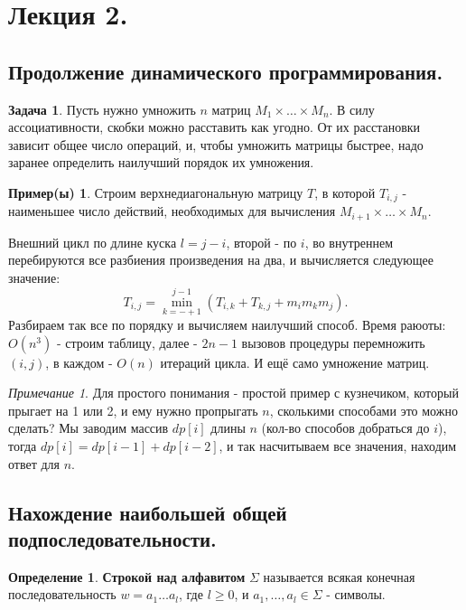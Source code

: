 \documentclass[a4paper]{article}
\theoremstyle{indented}
\theoremstyle{definition}
\newtheorem{defn}{Определение}
\newtheorem{exl}{Пример(ы)}
\newtheorem{prob}{Задача}
\theoremstyle{remark}
\newtheorem{remark}{Примечание}
\begin{document}
\section{Лекция 2.}

\subsection{Продолжение динамического программирования.}

\begin{prob}
    Пусть нужно умножить $n$ матриц $M_1 \times \ldots \times M_n$. В силу ассоциативности, скобки можно расставить как угодно. От их расстановки зависит общее число операций, и, чтобы умножить матрицы быстрее, надо заранее определить наилучший порядок их умножения.
\end{prob}

\begin{exl}
    Строим верхнедиагональную матрицу $T$, в которой $T_{i, j}$ - наименьшее число действий, необходимых для вычисления $M_{i+1} \times \ldots \times M_n$. \ 

    Внешний цикл по длине куска $l=j-i$, второй - по $i$, во внутреннем перебируются все разбиения произведения на два, и вычисляется следующее значение:
    \[
        T_{i, j}=\min_{k=-+1}^{j-1}(T_{i, k}+T_{k, j}+m_im_km_j). 
    \]
    Разбираем так все по порядку и вычисляем наилучший способ. Время раюоты: $O(n^3)$ - строим таблицу, далее - $2n-1$ вызовов процедуры перемножить $(i, j)$, в каждом - $O(n)$ итераций цикла. И ещё само умножение матриц.
\end{exl}

\begin{remark}
    Для простого понимания - простой пример с кузнечиком, который прыгает на 1 или 2, и ему нужно пропрыгать $n$, сколькими способами это можно сделать? Мы заводим массив $dp[i]$ длины $n$ (кол-во способов добраться до $i$), тогда $dp[i]=dp[i-1]+dp[i-2]$, и так насчитываем все значения, находим ответ для $n$. 
\end{remark}

\subsection{Нахождение наибольшей общей подпоследовательности.}

\begin{defn}
    \textbf{Строкой над алфавитом} $\Sigma$ называется всякая конечная последовательность $w=a_1\ldots a_l$, где $l\geq 0$, и $a_1, \ldots, a_l \in \Sigma$ - символы.
\end{defn}
\end{document}
